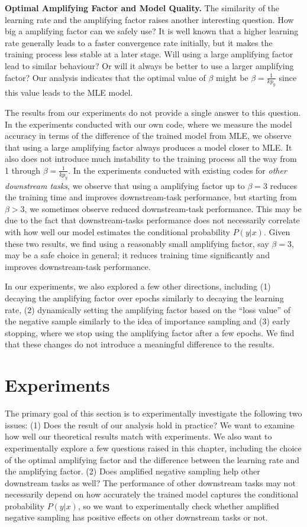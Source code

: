 \textbf{Optimal Amplifying Factor and Model Quality.} The similarity of the learning rate and the amplifying factor raises another interesting question. How big a amplifying factor can we safely use? It is well known that a higher learning rate generally leads to a faster convergence rate initially, but it makes the training process less stable at a later stage. Will using a large amplifying factor lead to similar behaviour? Or will it always be better to use a larger amplifying factor? Our analysis indicates that the optimal value of $\beta$ might be $\beta = \frac{1}{k p_y}$ since this value leads to the MLE model. 

The results from our experiments do not provide a single answer to this question. In the experiments conducted with our own code, where we measure the model accuracy in terms of the difference of the trained model from MLE, we observe that using a large amplifying factor always produces a model closer to MLE. It also does not introduce much instability to the training process all the way from 1 through $\beta = \frac{1}{k p_y}$. In the experiments conducted with existing codes for \emph{other downstream tasks}, we observe that using a amplifying factor up to $\beta = 3$ reduces the training time and improves downstream-task performance, but starting from $\beta > 3$, we sometimes observe reduced downstream-task performance. This may be due to the fact that downstream-tasks performance does not necessarily correlate with how well our model estimates the conditional probability $P(y|x)$. Given these two results, we find using a reasonably small amplifying factor, say $\beta = 3$, may be a safe choice in general; it reduces training time significantly and improves downstream-task performance.

In our experiments, we also explored a few other directions, including (1) decaying the amplifying factor over epochs similarly to decaying the learning rate, (2) dynamically setting the amplifying factor based on the ``loss value'' of the negative sample similarly to the idea of importance sampling and (3) early stopping, where we stop using the amplifying factor after a few epochs. We find that these changes do not introduce a meaningful difference to the results. 
\section{Experiments}
\label{sec:NS:exp}

The primary goal of this section is to experimentally investigate the following two issues: (1) Does the result of our analysis hold in practice? We want to examine how well our theoretical results match with experiments. We also want to experimentally explore a few questions raised in this chapter, including the choice of the optimal amplifying factor and the difference between the learning rate and the amplifying factor. (2) Does amplified negative sampling help other downstream tasks as well? The performance of other downstream tasks may not necessarily depend on how accurately the trained model captures the conditional probability $P(y|x)$, so we want to experimentally check whether amplified negative sampling has positive effects on other downstream tasks or not. 

